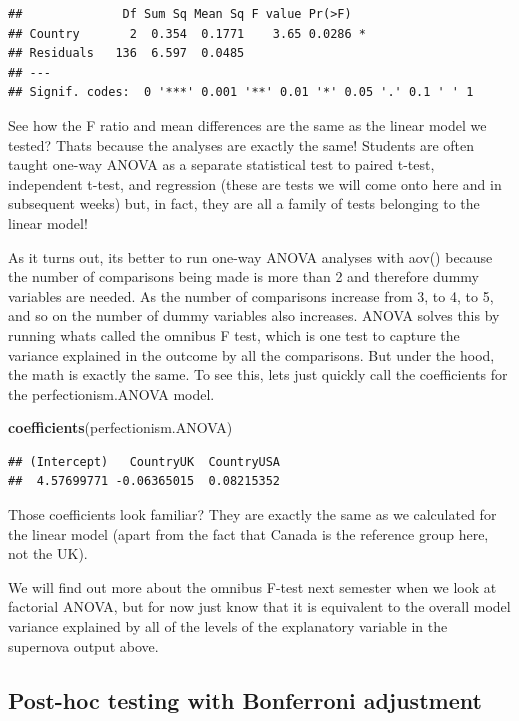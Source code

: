 \documentclass[
]{article}
\newenvironment{Shaded}{\begin{snugshade}}{\end{snugshade}}
\newcommand{\FunctionTok}[1]{\textcolor[rgb]{0.13,0.29,0.53}{\textbf{#1}}}
\newcommand{\NormalTok}[1]{#1}
\begin{document}
\begin{verbatim}
##              Df Sum Sq Mean Sq F value Pr(>F)  
## Country       2  0.354  0.1771    3.65 0.0286 *
## Residuals   136  6.597  0.0485                 
## ---
## Signif. codes:  0 '***' 0.001 '**' 0.01 '*' 0.05 '.' 0.1 ' ' 1
\end{verbatim}

See how the F ratio and mean differences are the same as the linear
model we tested? Thats because the analyses are exactly the same!
Students are often taught one-way ANOVA as a separate statistical test
to paired t-test, independent t-test, and regression (these are tests we
will come onto here and in subsequent weeks) but, in fact, they are all
a family of tests belonging to the linear model!

As it turns out, its better to run one-way ANOVA analyses with aov()
because the number of comparisons being made is more than 2 and
therefore dummy variables are needed. As the number of comparisons
increase from 3, to 4, to 5, and so on the number of dummy variables
also increases. ANOVA solves this by running whats called the omnibus F
test, which is one test to capture the variance explained in the outcome
by all the comparisons. But under the hood, the math is exactly the
same. To see this, lets just quickly call the coefficients for the
perfectionism.ANOVA model.

\begin{Shaded}
\begin{Highlighting}[]
\FunctionTok{coefficients}\NormalTok{(perfectionism.ANOVA)}
\end{Highlighting}
\end{Shaded}

\begin{verbatim}
## (Intercept)   CountryUK  CountryUSA 
##  4.57699771 -0.06365015  0.08215352
\end{verbatim}

Those coefficients look familiar? They are exactly the same as we
calculated for the linear model (apart from the fact that Canada is the
reference group here, not the UK).

We will find out more about the omnibus F-test next semester when we
look at factorial ANOVA, but for now just know that it is equivalent to
the overall model variance explained by all of the levels of the
explanatory variable in the supernova output above.

\subsection{Post-hoc testing with Bonferroni
adjustment}\label{post-hoc-testing-with-bonferroni-adjustment}
\end{document}
